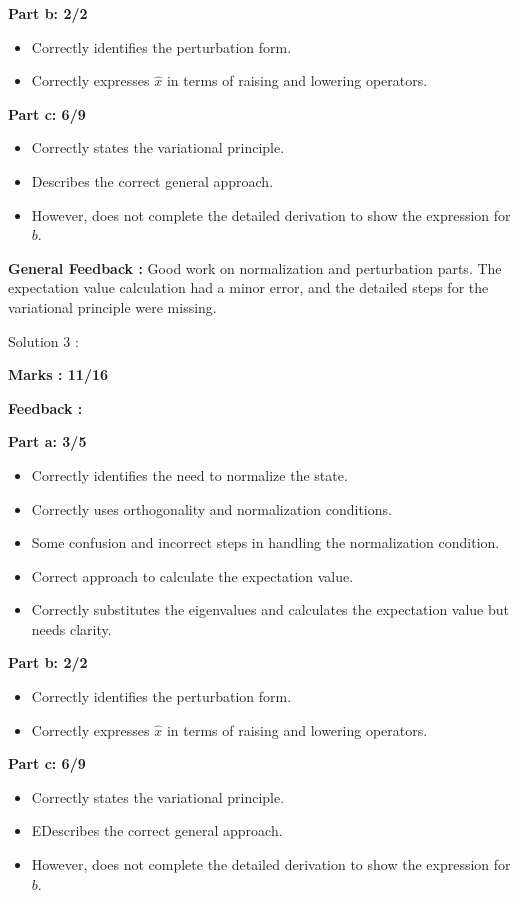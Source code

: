 \documentclass[a4paper,11pt]{article}
\begin{document}
\textbf{Part b: 2/2}
\begin{itemize}
    \item Correctly identifies the perturbation form.
    \item Correctly expresses $\hat{x}$ in terms of raising and lowering operators.
\end{itemize}

\textbf{Part c: 6/9}
\begin{itemize}
    \item Correctly states the variational principle.
    \item Describes the correct general approach.
    \item However, does not complete the detailed derivation to show the expression for $b$.
\end{itemize}

\textbf{General Feedback :}
Good work on normalization and perturbation parts. The expectation value calculation had a minor error, and the detailed steps for the variational principle were missing.



Solution 3 :

\textbf{Marks : 11/16}

\textbf{Feedback :}

\textbf{Part a: 3/5}
\begin{itemize}
    \item Correctly identifies the need to normalize the state.
    \item Correctly uses orthogonality and normalization conditions.
    \item Some confusion and incorrect steps in handling the normalization condition.
    \item Correct approach to calculate the expectation value.
    \item Correctly substitutes the eigenvalues and calculates the expectation value but needs clarity.
\end{itemize}

\textbf{Part b: 2/2}
\begin{itemize}
    \item Correctly identifies the perturbation form.
    \item Correctly expresses $\hat{x}$ in terms of raising and lowering operators.
\end{itemize}

\textbf{Part c: 6/9}
\begin{itemize}
    \item Correctly states the variational principle.
    \item EDescribes the correct general approach.
    \item However, does not complete the detailed derivation to show the expression for $b$.
\end{itemize}
\end{document}
